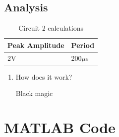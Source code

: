 \documentclass[a4paper,12pt]{article}
\newenvironment{QandA}
	{\begin{enumerate}[label=\arabic*.]\sl} %
  {\end{enumerate}}
\newenvironment{answered}{\par\normalfont}{} %
\begin{document}
	\subsection{Analysis}
	\begin{table}[H]
	\centering
		\begin{tabular}{|M{.5\textwidth}|M{.5\textwidth}|} %
		\hline
		\textbf{Peak Amplitude} & \textbf{Period} \\ \hline
		2V & 200$\mu$s \\ \hline
		\end{tabular}						
		\caption{Circuit 2 calculations}	
	\end{table}
	
	\begin{QandA}

	\section{Questions}
	\item How does it work?
		\begin{answered}
			Black magic	
		\end{answered}

	\end{QandA}	
	
	\section{MATLAB Code}
	
\end{document}
